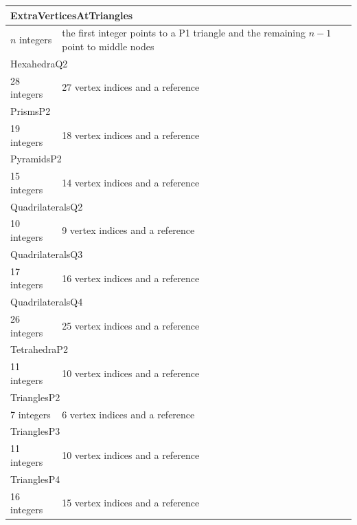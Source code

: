 \documentclass[a4paper,12pt]{article}
\begin{document}
\begin{longtable}{|m{4cm}|m{11cm}|}
\multicolumn{2}{|l|}{ExtraVerticesAtTriangles} \\
\hline
$n$ integers & the first integer points to a P1 triangle and the remaining $n-1$ point to middle nodes \\
\hline\hline

\multicolumn{2}{|l|}{HexahedraQ2} \\
\hline
28 integers & 27 vertex indices and a reference \\
\hline\hline

\multicolumn{2}{|l|}{PrismsP2} \\
\hline
19 integers & 18 vertex indices and a reference \\
\hline\hline

\multicolumn{2}{|l|}{PyramidsP2} \\
\hline
15 integers & 14 vertex indices and a reference \\
\hline\hline

\multicolumn{2}{|l|}{QuadrilateralsQ2} \\
\hline
10 integers & 9 vertex indices and a reference \\
\hline\hline

\multicolumn{2}{|l|}{QuadrilateralsQ3} \\
\hline
17 integers & 16 vertex indices and a reference \\
\hline\hline

\multicolumn{2}{|l|}{QuadrilateralsQ4} \\
\hline
26 integers & 25 vertex indices and a reference \\
\hline\hline

\multicolumn{2}{|l|}{TetrahedraP2} \\
\hline
11 integers & 10 vertex indices and a reference \\
\hline\hline

\multicolumn{2}{|l|}{TrianglesP2} \\
\hline
7 integers & 6 vertex indices and a reference \\
\hline\hline

\multicolumn{2}{|l|}{TrianglesP3} \\
\hline
11 integers & 10 vertex indices and a reference \\
\hline\hline

\multicolumn{2}{|l|}{TrianglesP4} \\
\hline
16 integers & 15 vertex indices and a reference \\
\hline\hline

\end{longtable}
\end{document}
